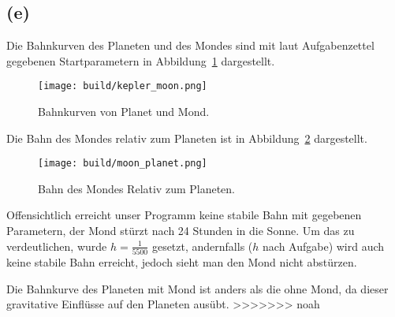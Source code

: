 \documentclass{scrartcl}
\begin{document}
\subsection*{(e)}
Die Bahnkurven des Planeten und des Mondes sind mit laut Aufgabenzettel gegebenen Startparametern
in Abbildung~\ref{fig:kepler_moon} dargestellt.
\begin{figure}[ht]
  \centering
  \texttt{[image: build/kepler\_moon.png]}
  \caption{Bahnkurven von Planet und Mond.}%
  \label{fig:kepler_moon}
\end{figure}

Die Bahn des Mondes relativ zum Planeten ist in Abbildung~\ref{fig:moon_planet} dargestellt.
\begin{figure}[ht]
  \centering
  \texttt{[image: build/moon\_planet.png]}
  \caption{Bahn des Mondes Relativ zum Planeten.}%
  \label{fig:moon_planet}
\end{figure}

Offensichtlich erreicht unser Programm keine stabile Bahn mit gegebenen Parametern, der Mond
stürzt nach 24 Stunden in die Sonne.
Um das zu verdeutlichen, wurde $h = \frac{1}{5500}$ gesetzt, andernfalls ($h$ nach Aufgabe) wird
auch keine stabile Bahn erreicht, jedoch sieht man den Mond nicht abstürzen.

Die Bahnkurve des Planeten mit Mond ist anders als die ohne Mond, da dieser gravitative Einflüsse auf den
Planeten ausübt.
>>>>>>> noah
\end{document}
